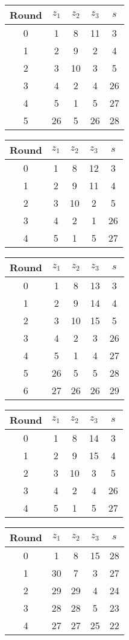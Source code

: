 \begin{multicols}{2}
\begin{tabular}{c | c | c | c | c }
Round & $z_1$ & $z_2$ & $z_3$ & $s$ \\
\hline
0 & 1 & 8 & 11 & 3 \\
1 & 2 & 9 & 2 & 4 \\
2 & 3 & 10 & 3 & 5 \\
3 & 4 & 2 & 4 & 26 \\
4 & 5 & 1 & 5 & 27 \\
5 & 26 & 5 & 26 & 28
\end{tabular}



\begin{tabular}{c | c | c | c | c }
Round & $z_1$ & $z_2$ & $z_3$ & $s$ \\
\hline
0 & 1 & 8 & 12 & 3 \\
1 & 2 & 9 & 11 & 4 \\
2 & 3 & 10 & 2 & 5 \\
3 & 4 & 2 & 1 & 26 \\
4 & 5 & 1 & 5 & 27
\end{tabular}


\begin{tabular}{c | c | c | c | c }
Round & $z_1$ & $z_2$ & $z_3$ & $s$ \\
\hline
0 & 1 & 8 & 13 & 3 \\
1 & 2 & 9 & 14 & 4 \\
2 & 3 & 10 & 15 & 5 \\
3 & 4 & 2 & 3 & 26 \\
4 & 5 & 1 & 4 & 27 \\
5 & 26 & 5 & 5 & 28 \\
6 & 27 & 26 & 26 & 29
\end{tabular}


\begin{tabular}{c | c | c | c | c }
Round & $z_1$ & $z_2$ & $z_3$ & $s$ \\
\hline
0 & 1 & 8 & 14 & 3 \\
1 & 2 & 9 & 15 & 4 \\
2 & 3 & 10 & 3 & 5 \\
3 & 4 & 2 & 4 & 26 \\
4 & 5 & 1 & 5 & 27
\end{tabular}


\begin{tabular}{c | c | c | c | c }
Round & $z_1$ & $z_2$ & $z_3$ & $s$ \\
\hline
0 & 1 & 8 & 15 & 28 \\
1 & 30 & 7 & 3 & 27 \\
2 & 29 & 29 & 4 & 24 \\
3 & 28 & 28 & 5 & 23 \\
4 & 27 & 27 & 25 & 22 \\
\end{tabular}


\end{multicols}
